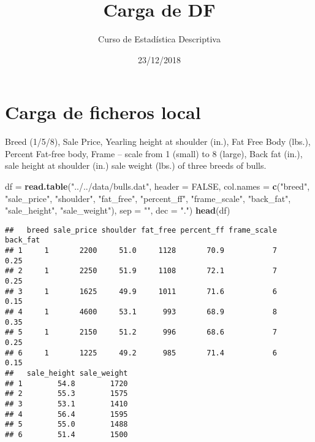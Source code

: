 \documentclass[
]{article}
\title{Carga de DF}
\author{Curso de Estadística Descriptiva}
\date{23/12/2018}
\newenvironment{Shaded}{\begin{snugshade}}{\end{snugshade}}
\newcommand{\DataTypeTok}[1]{\textcolor[rgb]{0.13,0.29,0.53}{#1}}
\newcommand{\KeywordTok}[1]{\textcolor[rgb]{0.13,0.29,0.53}{\textbf{#1}}}
\newcommand{\NormalTok}[1]{#1}
\newcommand{\OtherTok}[1]{\textcolor[rgb]{0.56,0.35,0.01}{#1}}
\newcommand{\StringTok}[1]{\textcolor[rgb]{0.31,0.60,0.02}{#1}}
\begin{document}
\maketitle

\hypertarget{carga-de-ficheros-local}{%
\section{Carga de ficheros local}\label{carga-de-ficheros-local}}

Breed (1/5/8), Sale Price, Yearling height at shoulder (in.), Fat Free
Body (lbs.), Percent Fat-free body, Frame -- scale from 1 (small) to 8
(large), Back fat (in.), sale height at shoulder (in.) sale weight
(lbs.) of three breeds of bulls.

\begin{Shaded}
\begin{Highlighting}[]
\NormalTok{df =}\StringTok{ }\KeywordTok{read.table}\NormalTok{(}\StringTok{"../../data/bulls.dat"}\NormalTok{,}
                \DataTypeTok{header =} \OtherTok{FALSE}\NormalTok{, }
                \DataTypeTok{col.names =} \KeywordTok{c}\NormalTok{(}\StringTok{"breed"}\NormalTok{, }\StringTok{"sale_price"}\NormalTok{, }\StringTok{"shoulder"}\NormalTok{,}
                          \StringTok{"fat_free"}\NormalTok{, }\StringTok{"percent_ff"}\NormalTok{, }\StringTok{"frame_scale"}\NormalTok{,}
                          \StringTok{"back_fat"}\NormalTok{, }\StringTok{"sale_height"}\NormalTok{, }\StringTok{"sale_weight"}\NormalTok{),}
                \DataTypeTok{sep =} \StringTok{""}\NormalTok{, }\DataTypeTok{dec =} \StringTok{"."}\NormalTok{)}
\KeywordTok{head}\NormalTok{(df)}
\end{Highlighting}
\end{Shaded}

\begin{verbatim}
##   breed sale_price shoulder fat_free percent_ff frame_scale back_fat
## 1     1       2200     51.0     1128       70.9           7     0.25
## 2     1       2250     51.9     1108       72.1           7     0.25
## 3     1       1625     49.9     1011       71.6           6     0.15
## 4     1       4600     53.1      993       68.9           8     0.35
## 5     1       2150     51.2      996       68.6           7     0.25
## 6     1       1225     49.2      985       71.4           6     0.15
##   sale_height sale_weight
## 1        54.8        1720
## 2        55.3        1575
## 3        53.1        1410
## 4        56.4        1595
## 5        55.0        1488
## 6        51.4        1500
\end{verbatim}
\end{document}
